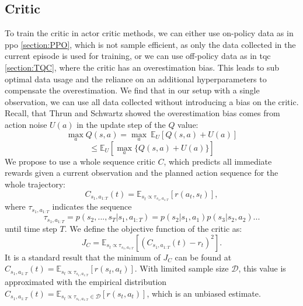\subsection{Critic}
\label{sec:AC_Critic}
To train the critic in actor critic methods, we can either use on-policy data as in \ac{ppo} \ref{section:PPO}, which is not sample efficient, as only the data collected 
in the current episode is used for training, or we can use off-policy data as in \ac{tqc} \ref{section:TQC}, where the critic has an overestimation bias. This 
leads to sub optimal data usage and the reliance on an additional hyperparameters to compensate the overestimation. We find that in our setup with a single observation, we can use all data 
collected without introducing a bias on the critic. \\
Recall, that Thrun and Schwartz \cite{thrun1993issues} showed the overestimation bias comes from action noise $U(a)$ in the update step of the $Q$ value:
\begin{equation*}
    \max_{a}Q(s,a) = \max_{a}\ \mathbb{E}_U \left[Q(s,a) + U(a)\right]
\end{equation*}
\begin{equation}
    \leq \mathbb{E}_U \left[\max_a \{Q(s,a) + U(a)\}\right]
\end{equation}
We propose to use a whole sequence critic $C$, which predicts all immediate rewards given a current observation 
and the planned action sequence for the whole trajectory:
\begin{equation}
    \label{eq:emp_mean_c}
    C_{s_1, a_{1:T}}(t) = \mathbb{E}_{s_t \propto \tau_{s_1, a_{1:T}}}\left[r(a_t, s_t)\right],
\end{equation}
where $\tau_{s_1, a_{1:T}}$ indicates the sequence 
$$\tau_{s_1, a_{1:T}} = p(s_2, ..., s_T|s_1, a_{1:T}) = p(s_2|s_1, a_1) p(s_3|s_2,a_2)...$$
 until time step $T$. 
We define the objective function of the critic as:
\begin{equation}
    J_C = \mathbb{E}_{s_t \propto \tau_{s_1, a_{1:T}}}\left[(C_{s_1, a_{1:T}}(t) - r_t)^2\right].
\end{equation}
It is a standard result that the minimum of $J_C$ can be found at $C_{s_1, a_{1:T}}(t) = \mathbb{E}_{s_t \propto \tau_{s_1, a_{1:T}}}\left[r(s_t, a_t)\right]$. 
With limited sample size $\mathcal{D}$, this value is approximated with the empirical distribution $C_{s_1, a_{1:T}}(t) = \mathbb{E}_{s_t \propto \tau_{s_1, a_{1:T}} \in \mathcal{D}}\left[r(s_t, a_t)\right]$, 
which is an unbiased estimate.\\

